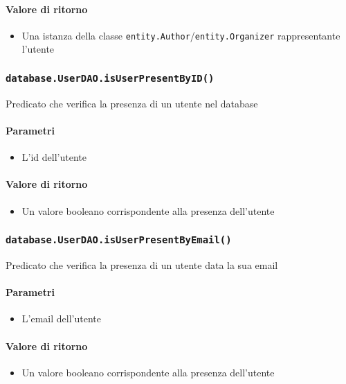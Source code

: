 \paragraph{Valore di ritorno}
\begin{itemize}
\item Una istanza della classe
  \texttt{entity.Author}/\texttt{entity.Organizer} rappresentante
  l'utente
\end{itemize}

\subsubsection{\texttt{database.UserDAO.isUserPresentByID()}}
Predicato che verifica la presenza di un utente nel database
  \paragraph{Parametri}
  \begin{itemize}
    \item L'id dell'utente
  \end{itemize}
  \paragraph{Valore di ritorno}
  \begin{itemize}
    \item Un valore booleano corrispondente alla presenza dell'utente
    \end{itemize}

    \subsubsection{\texttt{database.UserDAO.isUserPresentByEmail()}}
    Predicato che verifica la presenza di un utente data la sua email
    \paragraph{Parametri}
    \begin{itemize}
    \item L'email dell'utente
    \end{itemize}
    \paragraph{Valore di ritorno}
    \begin{itemize}
    \item Un valore booleano corrispondente alla presenza dell'utente
    \end{itemize}

